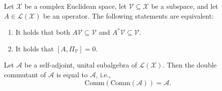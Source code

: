 \begin{lemma}\label{lem:InvariantSubspace}
    Let $\mathcal{X}$ be a complex Euclidean space, let $\mathcal{V} \subseteq \mathcal{X}$ be a subspace, and let $A \in \mathcal{L}(\mathcal{X})$ be an operator.
    The following statements are equivalent:
    \begin{enumerate}
        \item It holds that both $A\mathcal{V} \subseteq \mathcal{V}$ and $A^{*}\mathcal{V} \subseteq \mathcal{V}$.
        \item It holds that $[A, \Pi_{\mathcal{V}}] = 0$.
    \end{enumerate}

\end{lemma}

\begin{theorem}\label{thm:DoubleCommutant}
    Let $\mathcal{A}$ be a self-adjoint, unital subalgebra of $\mathcal{L}(\mathcal{X})$.
    Then the double commutant of $\mathcal{A}$ is equal to $\mathcal{A}$, i.e.,
    \begin{equation}
        \text{Comm}(\text{Comm}(\mathcal{A})) = \mathcal{A}.
    \end{equation}

\end{theorem}

